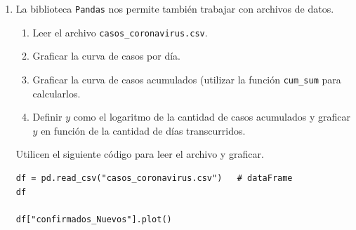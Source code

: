 \documentclass[a4paper,11pt]{article}
\theoremstyle{definition}
\begin{document}
\begin{enumerate}[resume]
\item La biblioteca \lstinline{Pandas} nos permite tambi\'en trabajar con archivos de datos.

\begin{enumerate}
\item Leer el archivo \lstinline{casos_coronavirus.csv}.
\item Graficar la curva de casos por d\'ia.
\item Graficar la curva de casos acumulados (utilizar la función \lstinline{cum_sum} para calcularlos.
\item Definir $y$ como el logaritmo de la cantidad de casos acumulados y graficar $y$ en funci\'on de la cantidad de d\'ias transcurridos.
\end{enumerate}
Utilicen el siguiente c\'odigo para leer el archivo y graficar.

\begin{lstlisting}
df = pd.read_csv("casos_coronavirus.csv")   # dataFrame
df

df["confirmados_Nuevos"].plot()
\end{lstlisting}

\end{enumerate}
\end{document}
